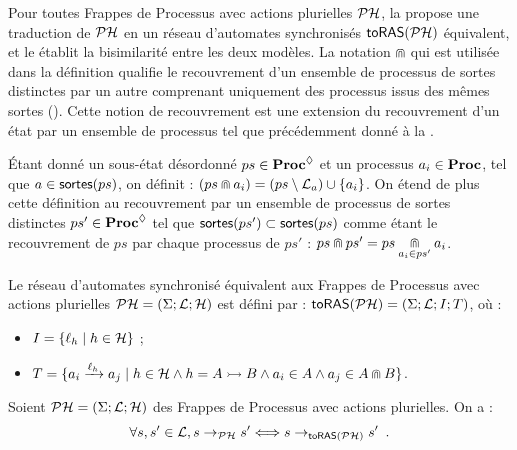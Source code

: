Pour toutes Frappes de Processus avec actions plurielles $\PH$,
la  propose une traduction de $\PH$
en un réseau d'automates synchronisés $\phmtoan[\PH]$ équivalent,
et le  établit la bisimilarité entre les deux modèles.
La notation $\recouvre$ qui est utilisée dans la définition
qualifie le recouvrement d'un ensemble de processus de sortes distinctes
par un autre comprenant uniquement des processus issus des mêmes sortes
().
Cette notion de recouvrement est une extension
du recouvrement d'un état par un ensemble de processus
tel que précédemment donné à la .

\begin{definition}
  Étant donné un sous-état désordonné $ps \in \PHsublset$ et un processus $a_i \in \Proc$,
  tel que $a \in \sortes{ps}$, on définit :
  $(ps \recouvre a_i) = (ps \setminus \PHl_a) \cup \{ a_i \}$.
  On étend de plus cette définition
  au recouvrement par un ensemble de processus de sortes distinctes
  $ps' \in \PHsublset$ tel que $\sortes{ps'} \subset \sortes{ps}$
  comme étant le recouvrement de $ps$ par chaque processus de $ps'$ :
  $ps \recouvre ps' = ps \underset{a_i \in ps'}{\recouvre} a_i$.
\end{definition}

\begin{definition}
  Le réseau d'automates synchronisé équivalent aux Frappes de Processus
  avec actions plurielles $\PH = (\PHs; \PHl; \PHh)$
  est défini par : $\phmtoan = (\PHs; \PHl; \ANi; \ANt)$, où :
  \begin{itemize}
    \item $\ANi = \{ \ell_h \mid h \in \PHh \}$ ; %
    \item $\ANt = \{ \ANaction{a_i}{\ell_h}{a_j} \mid
      h \in \PHh \wedge h = \PHfrappemult{A}{B} \wedge a_i \in A \wedge a_j \in A \recouvre B \}$.
  \end{itemize}
\end{definition}

\begin{theorem}[$\PH \approx \phmtoan$]
  Soient $\PH = (\PHs; \PHl; \PHh)$ des Frappes de Processus avec actions plurielles.
  On a :
  \[\forall s, s' \in \PHl, s \PHtrans s' \Longleftrightarrow s \trans{\phmtoan} s' \enspace.\]
\end{theorem}

